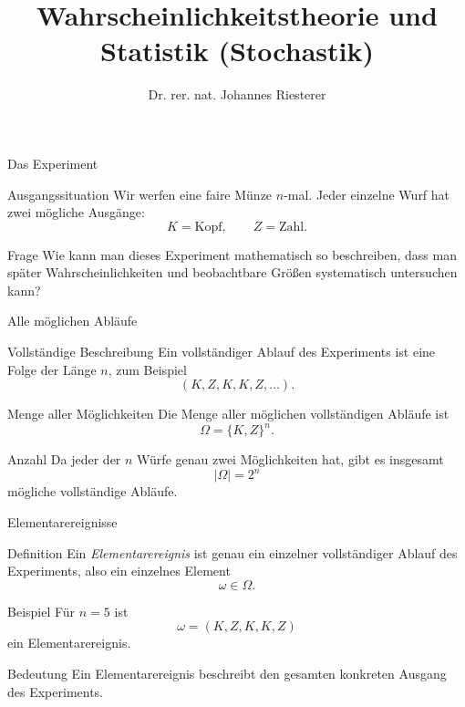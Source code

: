 \documentclass{beamer}
\begin{document}
\title[Stochastik]
{Wahrscheinlichkeitstheorie und Statistik (Stochastik)}
\author[Dr. Johannes Riesterer]
{Dr. rer. nat. Johannes Riesterer}
\date{}
\subject{Stochastik}

\frame{\titlepage}

\begin{frame}{Das Experiment}
\begin{block}{Ausgangssituation}
Wir werfen eine faire Münze \(n\)-mal.
Jeder einzelne Wurf hat zwei mögliche Ausgänge:
\[
K=\text{Kopf}, \qquad Z=\text{Zahl}.
\]
\end{block}

\begin{block}{Frage}
Wie kann man dieses Experiment mathematisch so beschreiben, dass man
später Wahrscheinlichkeiten und beobachtbare Größen systematisch untersuchen kann?
\end{block}
\end{frame}

\begin{frame}{Alle möglichen Abläufe}
\begin{block}{Vollständige Beschreibung}
Ein vollständiger Ablauf des Experiments ist eine Folge der Länge \(n\), zum Beispiel
\[
(K,Z,K,K,Z,\dots).
\]
\end{block}

\begin{block}{Menge aller Möglichkeiten}
Die Menge aller möglichen vollständigen Abläufe ist
\[
\Omega=\{K,Z\}^n.
\]
\end{block}

\begin{block}{Anzahl}
Da jeder der \(n\) Würfe genau zwei Möglichkeiten hat, gibt es insgesamt
\[
|\Omega|=2^n
\]
mögliche vollständige Abläufe.
\end{block}
\end{frame}

\begin{frame}{Elementarereignisse}
\begin{block}{Definition}
Ein \emph{Elementarereignis} ist genau ein einzelner vollständiger Ablauf des Experiments,
also ein einzelnes Element
\[
\omega\in\Omega.
\]
\end{block}

\begin{block}{Beispiel}
Für \(n=5\) ist
\[
\omega=(K,Z,K,K,Z)
\]
ein Elementarereignis.
\end{block}

\begin{block}{Bedeutung}
Ein Elementarereignis beschreibt den gesamten konkreten Ausgang des Experiments.
\end{block}
\end{frame}
\end{document}
